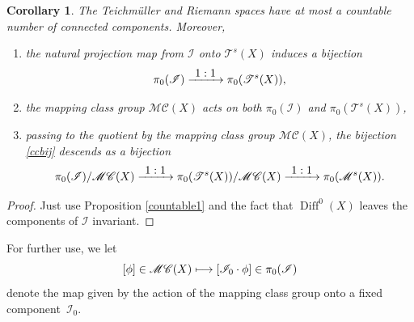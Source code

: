 \documentclass[JEP,XML,SOM,Unicode]{cedram}
\let\mathcal\mathscr
\def\mto{\mathchoice{\longmapsto}{\mapsto}{\mapsto}{\mapsto}}
\def\To#1{\mathchoice{\xrightarrow{\textstyle\kern4pt#1\kern3pt}}{\stackrel{#1}{\longrightarrow}}{}{}}
\DeclareMathOperator{\Diff}{Diff}
\theoremstyle{plain}
\newtheorem{corollary}[theorem]{Corollary}
\theoremstyle{definition}
\theoremstyle{remark}
\numberwithin{equation}{section}
\newcommand{\cI}{\mathcal{I}}
\begin{document}
\begin{corollary}
\label{countableTeich}
The Teichmüller and Riemann spaces have at most a countable number of connected components. Moreover,
\begin{enumerate}
\item
the natural projection map from $\cI$ onto $\mathcal T^s(X)$ induces a bijection
\begin{equation}
\label{ccbij}
\pi_0(\cI)\To{1:1}\pi_0(\mathcal T^s(X)),
\end{equation}
\item
the mapping class group $\mathcal M\mathcal C(X)$ acts on both $\pi_0(\cI)$ and $\pi_0(\mathcal T^s(X))$,
\item
passing to the quotient by the mapping class group $\mathcal M\mathcal C(X)$, the bijection \eqref{ccbij} descends as a bijection
\begin{equation}
\label{ccbij2}
\pi_0(\cI)/\mathcal M\mathcal C(X)\To{1:1}\pi_0(\mathcal T^s(X))/\mathcal M\mathcal C(X)\To{1:1}\pi_0(\mathcal M^s(X)).
\end{equation}
\end{enumerate}
\end{corollary}

\begin{proof}
Just use Proposition \ref{countable1} and the fact that $\Diff^0(X)$ leaves the components of $\cI$ invariant.
\end{proof}

For further use, we let
\begin{equation}
\label{mccc}
[\phi]\in\mathcal M\mathcal C(X)\mto [\cI_0\cdot \phi]\in\pi_0(\cI)
\end{equation}
denote the map given by the action of the mapping class group onto a fixed component~$\cI_0$.
\end{document}
